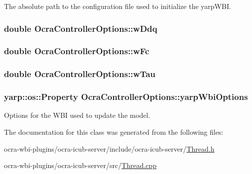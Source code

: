 \-The absolute path to the configuration file used to initialize the yarp\-W\-B\-I. \hypertarget{classOcraControllerOptions_aab63ca12dec23284464b978c4e3e1c62}{
\subsubsection[{w\-Ddq}]{\setlength{\rightskip}{0pt plus 5cm}double {\bf \-Ocra\-Controller\-Options\-::w\-Ddq}}}\label{classOcraControllerOptions_aab63ca12dec23284464b978c4e3e1c62}
\hypertarget{classOcraControllerOptions_a96706a52ac56f2598d03e80c9c778ce7}{
\subsubsection[{w\-Fc}]{\setlength{\rightskip}{0pt plus 5cm}double {\bf \-Ocra\-Controller\-Options\-::w\-Fc}}}\label{classOcraControllerOptions_a96706a52ac56f2598d03e80c9c778ce7}
\hypertarget{classOcraControllerOptions_ada37aedbe3639334803637b55c650bc0}{
\subsubsection[{w\-Tau}]{\setlength{\rightskip}{0pt plus 5cm}double {\bf \-Ocra\-Controller\-Options\-::w\-Tau}}}\label{classOcraControllerOptions_ada37aedbe3639334803637b55c650bc0}
\hypertarget{classOcraControllerOptions_ac3965bdcce6cb2ce3e4a335f855acd63}{
\subsubsection[{yarp\-Wbi\-Options}]{\setlength{\rightskip}{0pt plus 5cm}yarp\-::os\-::\-Property {\bf \-Ocra\-Controller\-Options\-::yarp\-Wbi\-Options}}}\label{classOcraControllerOptions_ac3965bdcce6cb2ce3e4a335f855acd63}
\-Options for the \-W\-B\-I used to update the model. 

\-The documentation for this class was generated from the following files\-:\begin{DoxyCompactItemize}
\item 
ocra-\/wbi-\/plugins/ocra-\/icub-\/server/include/ocra-\/icub-\/server/\hyperlink{Thread_8h}{\-Thread.\-h}\item 
ocra-\/wbi-\/plugins/ocra-\/icub-\/server/src/\hyperlink{Thread_8cpp}{\-Thread.\-cpp}\end{DoxyCompactItemize}

